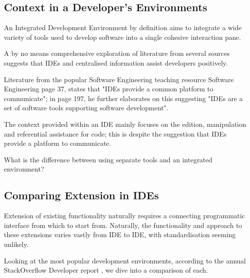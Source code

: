 \subsection{Context in a Developer's Environments}

An Integrated Development Environment by definition aims to integrate a wide variety of tools used to develop software into a single cohesive interaction pane. 

A by no means comprehensive exploration of literature from several sources suggests that IDEs and centralised information assist developers positively. 

Literature from the popular Software Engineering teaching resource Software Engineering \parencite{Sommerville:2010:SE:1841764} page 37, states that "IDEs provide a common platform to communicate"; in page 197, he further elaborates on this suggesting "IDEs are a set of software tools supporting software development".

The context provided within an IDE mainly focuses on the edition, manipulation and referential assistance for code; this is despite the suggestion that IDEs provide a platform to communicate.

What is the difference between using separate tools and an integrated environment?

\subsection{Comparing Extension in IDEs}

Extension of existing functionality naturally requires a connecting programmatic interface from which to start from. Naturally, the functionality and approach to these extensions varies vastly from IDE to IDE, with standardisation seeming unlikely. 

Looking at the most popular development environments, according to the annual StackOverflow Developer report \parencite{stackOverflowDevReport2019}, we dive into a comparison of each.







